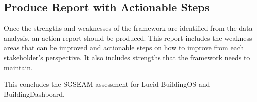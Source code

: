 \subsection{Produce Report with Actionable Steps}

Once the strengths and weaknesses of the framework are identified from
the data analysis, an action report should be produced.  This report
includes the weakness areas that can be improved and actionable steps
on how to improve from each stakeholder's perspective. It also
includes strengths that the framework needs to maintain.

This concludes the SGSEAM assessment for Lucid BuildingOS and BuildingDashboard.
